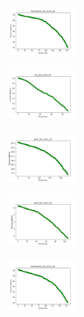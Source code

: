\begin{figure}[H]
\begin{subfigure}
    \end{subfigure}
    \hfill
    \begin{subfigure}
        \centering
        \includegraphics[width=0.234\textwidth]{img/bl/newthyroid_set_const_20_277451237_cost.png}
    \end{subfigure}
    \hfill
    \begin{subfigure}
        \centering
        \includegraphics[width=0.234\textwidth]{img/bl/iris_set_const_20_49258669_cost.png}
    \end{subfigure}
    \hfill
    \begin{subfigure}
        \centering
        \includegraphics[width=0.234\textwidth]{img/bl/ecoli_set_const_20_49258669_cost.png}
    \end{subfigure}
    \hfill
    \begin{subfigure}
        \centering
        \includegraphics[width=0.234\textwidth]{img/bl/rand_set_const_20_49258669_cost.png}
    \end{subfigure}
    \hfill
    \begin{subfigure}
        \centering
        \includegraphics[width=0.234\textwidth]{img/bl/newthyroid_set_const_20_49258669_cost.png}
    \end{subfigure}
    \hfill
    \begin{subfigure}

\end{subfigure}
\end{figure}
